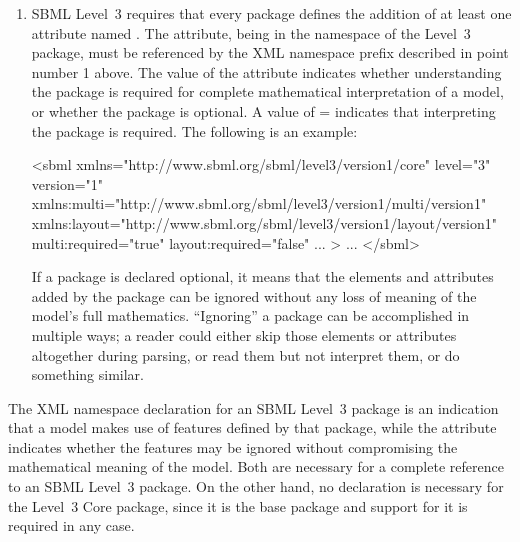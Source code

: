 \begin{enumerate}
\item SBML Level~3 requires that every package defines the
  addition of at least one attribute named .  The
  attribute, being in the namespace of the Level~3 package, must
  be referenced by the XML namespace prefix described in point
  number 1 above.  The value of the  attribute
  indicates whether understanding the package is required for
  complete mathematical interpretation of a model, or whether the
  package is optional.  A value of =
  indicates that interpreting the package is required.  The
  following is an example:
  \begin{example}
<sbml xmlns="http://www.sbml.org/sbml/level3/version1/core" level="3" version="1"
      xmlns:multi="http://www.sbml.org/sbml/level3/version1/multi/version1"
      xmlns:layout="http://www.sbml.org/sbml/level3/version1/layout/version1"
      multi:required="true"
      layout:required="false" ... >
...
</sbml>   \end{example}
  If a package is declared optional, it means that the elements
  and attributes added by the package can be ignored without any
  loss of meaning of the model's full mathematics.  ``Ignoring'' a
  package can be accomplished in multiple ways; a reader could
  either skip those elements or attributes altogether during
  parsing, or read them but not interpret them, or do something
  similar.
  
\end{enumerate}

The XML namespace declaration for an SBML Level~3 package is an
indication that a model makes use of features defined by that
package, while the  attribute indicates whether
the features may be ignored without compromising the mathematical
meaning of the model.  Both are necessary for a complete reference
to an SBML Level~3 package.  On the other hand, no declaration is
necessary for the Level~3 Core package, since it is the base
package and support for it is required in any case.



